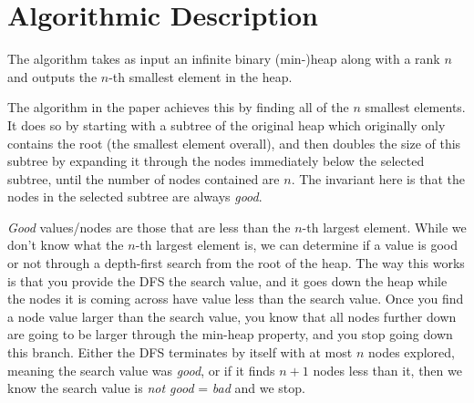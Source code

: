 \documentclass{article}
\begin{document}
\section{Algorithmic Description}
The algorithm takes as input an infinite binary (min-)heap along with a rank $n$ and outputs the $n$-th smallest element in the heap.

The algorithm in the paper achieves this by finding all of the $n$ smallest elements. It does so by starting with a subtree of the original heap which originally only contains the root (the smallest element overall), and then doubles the size of this subtree by expanding it through the nodes immediately below the selected subtree, until the number of nodes contained are $n$. The invariant here is that the nodes in the selected subtree are always \textit{good}. 

\textit{Good} values/nodes are those that are less than the $n$-th largest element. While we don't know what the $n$-th largest element is, we can determine if a value is good or not through a depth-first search from the root of the heap. The way this works is that you provide the DFS the search value, and it goes down the heap while the nodes it is coming across have value less than the search value. Once you find a node value larger than the search value, you know that all nodes further down are going to be larger through the min-heap property, and you stop going down this branch. Either the DFS terminates by itself with at most $n$ nodes explored, meaning the search value was \textit{good}, or if it finds $n+1$ nodes less than it, then we know the search value is \textit{not good} = \textit{bad} and we stop.
\end{document}
